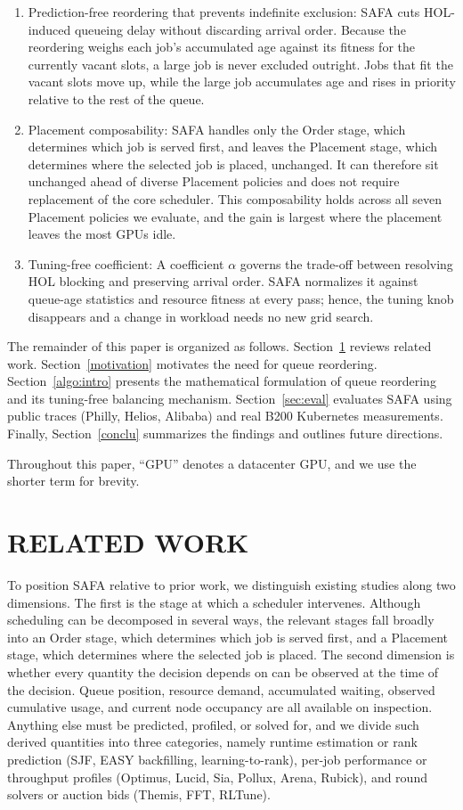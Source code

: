 \documentclass{ieeetj}
\begin{document}
\begin{enumerate}
\item Prediction-free reordering that prevents indefinite exclusion: SAFA cuts HOL-induced queueing delay without discarding arrival order. Because the reordering weighs each job's accumulated age against its fitness for the currently vacant slots, a large job is never excluded outright. Jobs that fit the vacant slots move up, while the large job accumulates age and rises in priority relative to the rest of the queue.
\item Placement composability: SAFA handles only the Order stage, which determines which job is served first, and leaves the Placement stage, which determines where the selected job is placed, unchanged. It can therefore sit unchanged ahead of diverse Placement policies and does not require replacement of the core scheduler. This composability holds across all seven Placement policies we evaluate, and the gain is largest where the placement leaves the most GPUs idle.
\item Tuning-free coefficient: A coefficient $\alpha$ governs the trade-off between resolving HOL blocking and preserving arrival order. SAFA normalizes it against queue-age statistics and resource fitness at every pass; hence, the tuning knob disappears and a change in workload needs no new grid search.
\end{enumerate}

The remainder of this paper is organized as follows. Section~\ref{Related} reviews related work. Section~\ref{motivation} motivates the need for queue reordering. Section~\ref{algo:intro} presents the mathematical formulation of queue reordering and its tuning-free balancing mechanism. Section~\ref{sec:eval} evaluates SAFA using public traces (Philly, Helios, Alibaba) and real B200 Kubernetes measurements. Finally, Section~\ref{conclu} summarizes the findings and outlines future directions.

Throughout this paper, ``GPU'' denotes a datacenter GPU, and we use the shorter term for brevity.

\section{RELATED WORK}\label{Related}
To position SAFA relative to prior work, we distinguish existing studies along two dimensions. The first is the stage at which a scheduler intervenes. Although scheduling can be decomposed in several ways, the relevant stages fall broadly into an Order stage, which determines which job is served first, and a Placement stage, which determines where the selected job is placed. The second dimension is whether every quantity the decision depends on can be observed at the time of the decision. Queue position, resource demand, accumulated waiting, observed cumulative usage, and current node occupancy are all available on inspection. Anything else must be predicted, profiled, or solved for, and we divide such derived quantities into three categories, namely runtime estimation or rank prediction (SJF, EASY backfilling, learning-to-rank), per-job performance or throughput profiles (Optimus, Lucid, Sia, Pollux, Arena, Rubick), and round solvers or auction bids (Themis, FFT, RLTune).
\end{document}
